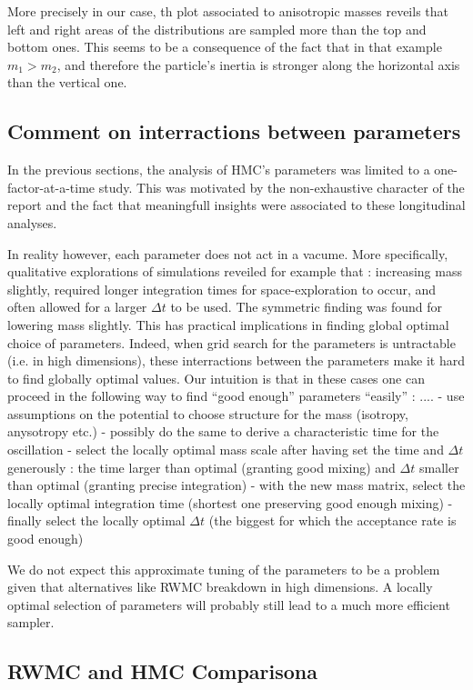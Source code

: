 \documentclass[a4paper, 12pt,oneside]{article}
\begin{document}
			More precisely in our case, th plot associated to anisotropic masses reveils that left and right areas of the distributions are sampled more than the top and bottom ones. This seems to be a consequence of the fact that in that example $m_1>m_2$, and therefore the particle's inertia is stronger along the horizontal axis than the vertical one. 
			\subsection{Comment on interractions between parameters}
			In the previous sections, the analysis of HMC's parameters was limited to a one-factor-at-a-time study. This was motivated by the non-exhaustive character of the report and the fact that meaningfull insights were associated to these longitudinal analyses. 
			
			In reality however, each parameter does not act in a vacume. More specifically, qualitative explorations of simulations reveiled for example that : increasing mass slightly, required longer integration times for space-exploration to occur, and often allowed for a larger $\Delta t$ to be used. The symmetric finding was found for lowering mass slightly. This has practical implications in finding global optimal choice of parameters. Indeed, when grid search for the parameters is untractable (i.e. in high dimensions), these interractions between the parameters make it hard to find globally optimal values. Our intuition is that in these cases one can proceed in the following way to find ``good enough'' parameters ``easily'' : 
			....  
			- use assumptions on the potential to choose structure for the mass (isotropy, anysotropy etc.)
			- possibly do the same to derive a characteristic time for the oscillation
			- select the locally optimal mass scale after having set  the time and $\Delta t$ generously : the time larger than optimal (granting good mixing) and $\Delta t$ smaller than optimal (granting precise integration)
			- with the new mass matrix, select the locally optimal integration time (shortest one preserving good enough mixing)
			- finally select the locally optimal $\Delta t$ (the biggest for which the acceptance rate is good enough)

			We do not expect this approximate tuning of the parameters to be a problem given that alternatives like RWMC breakdown in high dimensions. A locally optimal selection of parameters will probably still lead to a much more efficient sampler.   
		
		\subsection{RWMC and HMC Comparisona}
\end{document}
